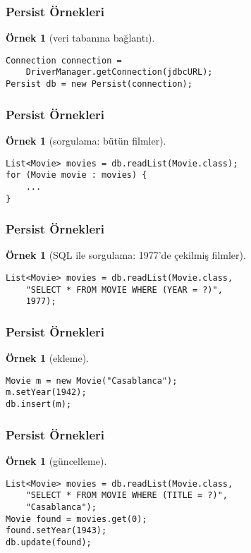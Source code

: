 \documentclass[dvipsnames]{beamer}
\theoremstyle{definition}
\theoremstyle{example}
\newtheorem{ornek}[theorem]{Örnek}
\theoremstyle{plain}
\begin{document}
\begin{frame}[fragile]
  \frametitle{Persist Örnekleri}

  \begin{ornek}[veri tabanına bağlantı]
    \begin{lstlisting}
Connection connection =
    DriverManager.getConnection(jdbcURL);
Persist db = new Persist(connection);
    \end{lstlisting}
  \end{ornek}
\end{frame}

\begin{frame}[fragile]
  \frametitle{Persist Örnekleri}

  \begin{ornek}[sorgulama: bütün filmler]
    \begin{lstlisting}
List<Movie> movies = db.readList(Movie.class);
for (Movie movie : movies) {
    ...
}
    \end{lstlisting}
  \end{ornek}
\end{frame}

\begin{frame}[fragile]
  \frametitle{Persist Örnekleri}

  \begin{ornek}[SQL ile sorgulama: 1977'de çekilmiş filmler]
    \begin{lstlisting}
List<Movie> movies = db.readList(Movie.class,
    "SELECT * FROM MOVIE WHERE (YEAR = ?)",
    1977);
    \end{lstlisting}
  \end{ornek}
\end{frame}

\begin{frame}[fragile]
  \frametitle{Persist Örnekleri}

  \begin{ornek}[ekleme]
    \begin{lstlisting}
Movie m = new Movie("Casablanca");
m.setYear(1942);
db.insert(m);
    \end{lstlisting}
  \end{ornek}
\end{frame}

\begin{frame}[fragile]
  \frametitle{Persist Örnekleri}

  \begin{ornek}[güncelleme]
    \begin{lstlisting}
List<Movie> movies = db.readList(Movie.class,
    "SELECT * FROM MOVIE WHERE (TITLE = ?)",
    "Casablanca");
Movie found = movies.get(0);
found.setYear(1943);
db.update(found);
    \end{lstlisting}
  \end{ornek}
\end{frame}
\end{document}
